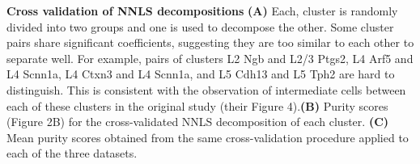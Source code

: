 \textbf{Cross validation of NNLS decompositions}
\textbf{(A)} Each\cite{Tasic_2016}, cluster is randomly divided into two groups and one is used to decompose the other. Some cluster pairs share significant coefficients, suggesting they are too similar to each other to separate well. For example, pairs of clusters L2 Ngb and L2/3 Ptgs2, L4 Arf5 and L4 Scnn1a, L4 Ctxn3 and L4 Scnn1a, and L5 Cdh13 and L5 Tph2 are hard to distinguish. This is consistent with the observation of intermediate cells between each of these clusters in the original study (their Figure 4).\textbf{(B)} Purity scores (Figure 2B) for the cross-validated NNLS decomposition of each \cite{Tasic_2016} cluster. \textbf{(C)} Mean purity scores obtained from the same cross-validation procedure applied to each of the three datasets. 